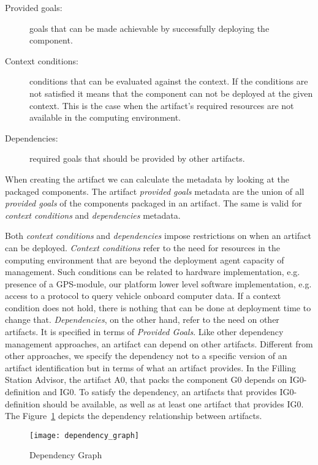 \begin{description}
  \item[Provided goals:] goals that can be made achievable by successfully deploying the component.
  \item[Context conditions:] conditions that can be evaluated against the context. If the conditions are not satisfied it means that the component can not be deployed at the given context. This is the case when the artifact's required resources are not available in the computing environment.
  \item[Dependencies:] required goals that should be provided by other artifacts.
\end{description}

When creating the artifact we can calculate the metadata by looking at the packaged components. The artifact \emph{provided goals} metadata are the union of all \emph{provided goals} of the components packaged in an artifact. The same is valid for \emph{context conditions} and \emph{dependencies} metadata.

Both \emph{context conditions} and \emph{dependencies} impose restrictions on when an artifact can be deployed.
\emph{Context conditions} refer to the need for resources in the computing environment that are beyond the deployment agent capacity of management. Such conditions can be related to hardware implementation, e.g. presence of a GPS-module, our platform lower level software implementation, e.g. access to a protocol to query vehicle onboard computer data. If a context condition does not hold, there is nothing that can be done at deployment time to change that.
\emph{Dependencies}, on the other hand, refer to the need on other artifacts. It is specified in terms of \emph{Provided Goals}. Like other dependency management approaches, an artifact can depend on other artifacts.
Different from other approaches, we specify the dependency not to a specific version of an artifact identification but in terms of what an artifact provides.
In the Filling Station Advisor, the artifact A0, that packs the component G0 depends on IG0-definition and IG0. To satisfy the dependency, an artifacts that provides IG0-definition should be available, as well as at least one artifact that provides IG0. The Figure~\ref{fig:dependency_graph} depicts the dependency relationship between artifacts.

\begin{figure}[!htb]
  \centering
  \texttt{[image: dependency\_graph]}
  \caption{Dependency Graph}
  \label{fig:dependency_graph}
\end{figure}

